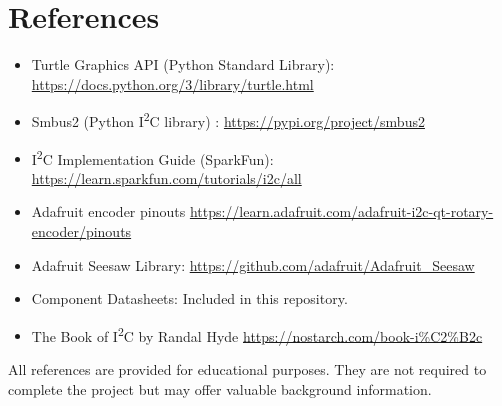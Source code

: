 \documentclass[]{article}
\begin{document}
\section*{References}

\begin{itemize}
	\item Turtle Graphics API (Python Standard Library): \url{https://docs.python.org/3/library/turtle.html}
	\item Smbus2 (Python I\textsuperscript{2}C library) : \url{https://pypi.org/project/smbus2}
	\item I\textsuperscript{2}C Implementation Guide (SparkFun): \url{https://learn.sparkfun.com/tutorials/i2c/all}
	\item Adafruit encoder pinouts \url{https://learn.adafruit.com/adafruit-i2c-qt-rotary-encoder/pinouts}
	\item Adafruit Seesaw Library: \url{https://github.com/adafruit/Adafruit_Seesaw}
	\item Component Datasheets: Included in this repository.
	\item The Book of I\textsuperscript{2}C by Randal Hyde \url{https://nostarch.com/book-i%C2%B2c}
\end{itemize}

All references are provided for educational purposes. They are not required to complete the project but may offer valuable background information.
\end{document}
